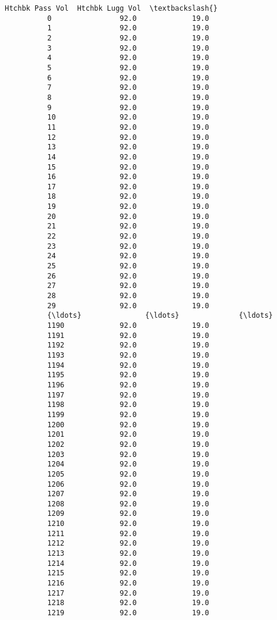 \documentclass[11pt]{article}
\begin{document}
\begin{Verbatim}[commandchars=\\\{\}]
                Htchbk Pass Vol  Htchbk Lugg Vol  \textbackslash{}
          0                92.0             19.0   
          1                92.0             19.0   
          2                92.0             19.0   
          3                92.0             19.0   
          4                92.0             19.0   
          5                92.0             19.0   
          6                92.0             19.0   
          7                92.0             19.0   
          8                92.0             19.0   
          9                92.0             19.0   
          10               92.0             19.0   
          11               92.0             19.0   
          12               92.0             19.0   
          13               92.0             19.0   
          14               92.0             19.0   
          15               92.0             19.0   
          16               92.0             19.0   
          17               92.0             19.0   
          18               92.0             19.0   
          19               92.0             19.0   
          20               92.0             19.0   
          21               92.0             19.0   
          22               92.0             19.0   
          23               92.0             19.0   
          24               92.0             19.0   
          25               92.0             19.0   
          26               92.0             19.0   
          27               92.0             19.0   
          28               92.0             19.0   
          29               92.0             19.0   
          {\ldots}               {\ldots}              {\ldots}   
          1190             92.0             19.0   
          1191             92.0             19.0   
          1192             92.0             19.0   
          1193             92.0             19.0   
          1194             92.0             19.0   
          1195             92.0             19.0   
          1196             92.0             19.0   
          1197             92.0             19.0   
          1198             92.0             19.0   
          1199             92.0             19.0   
          1200             92.0             19.0   
          1201             92.0             19.0   
          1202             92.0             19.0   
          1203             92.0             19.0   
          1204             92.0             19.0   
          1205             92.0             19.0   
          1206             92.0             19.0   
          1207             92.0             19.0   
          1208             92.0             19.0   
          1209             92.0             19.0   
          1210             92.0             19.0   
          1211             92.0             19.0   
          1212             92.0             19.0   
          1213             92.0             19.0   
          1214             92.0             19.0   
          1215             92.0             19.0   
          1216             92.0             19.0   
          1217             92.0             19.0   
          1218             92.0             19.0   
          1219             92.0             19.0   
          

\end{Verbatim}
\end{document}

